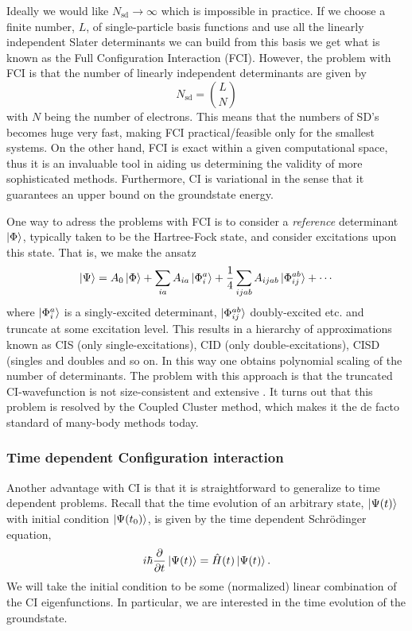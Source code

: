\documentclass[a4paper,10pt, twocolumn]{article}
\begin{document}
Ideally we would like $N_{\text{sd}} \rightarrow \infty$ which is impossible in practice. If we choose a finite number, $L$, of single-particle basis functions and use all the linearly independent 
Slater determinants we can build from this basis we get what is known as the Full Configuration Interaction (FCI). However, the problem with FCI is that the number of linearly independent 
determinants are given by 
\begin{equation}
 N_{\text{sd}} = \binom{L}{N}
\end{equation}
with $N$ being the number of electrons. This means that the numbers of SD's becomes huge very fast, making FCI practical/feasible only for the smallest systems. On the other hand, FCI is exact within 
a given computational space, thus it is an invaluable tool in aiding us determining the validity of more sophisticated methods. Furthermore, CI is variational in the sense that it guarantees an upper bound 
on the groundstate energy. 

One way to adress the problems with FCI is to consider a \textit{reference} determinant $\ket{\Phi}$, typically taken to be the Hartree-Fock state, and consider excitations upon this state. That is, 
we make the ansatz
\begin{equation}
 \ket{\Psi} = A_0 \ket{\Phi} + \sum_{ia} A_{ia} \ket{\Phi_{i}^a} + \frac{1}{4} \sum_{ijab} A_{ijab} \ket{\Phi_{ij}^{ab}} + \cdots
\end{equation}
where $\ket{\Phi_i^a}$ is a singly-excited determinant, $\ket{\Phi_{ij}^{ab}}$ doubly-excited etc. and truncate at some excitation level. 
This results in a hierarchy of approximations known as CIS (only single-excitations), CID (only double-excitations), CISD (singles and doubles and so on. In this way one obtains polynomial 
scaling of the number of determinants. The problem with this approach is that the truncated CI-wavefunction is not size-consistent and extensive \cite{Helgaker00book}. It turns out 
that this problem is resolved by the Coupled Cluster method, which makes it the de facto standard of many-body methods today.

\subsubsection{Time dependent Configuration interaction}
Another advantage with CI is that it is straightforward to generalize to time dependent problems. Recall that the time evolution of an  
arbitrary state, $\ket{\Psi(t)}$ with initial condition $\ket{\Psi(t_0)}$, is given by the time dependent Schrödinger equation, 
\begin{equation}
 i \hbar \frac{\partial}{\partial t}\ket{\Psi(t)} = \hat{H}(t) \ket{\Psi(t)}.
\end{equation}
We will take the initial condition to be some (normalized) linear combination of the CI eigenfunctions. In particular, we are interested in the 
time evolution of the groundstate.
\end{document}
